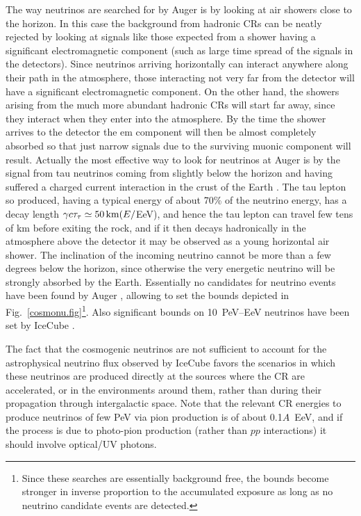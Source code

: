 \documentclass[twoside,12pt]{article}
\begin{document}
The way neutrinos are searched for by Auger is by looking at air showers close to the horizon. In this case the background from hadronic CRs can be neatly rejected by looking at signals like those expected from a shower having a significant  electromagnetic component (such as large time spread of the signals in the detectors). Since neutrinos arriving horizontally can interact anywhere along their path in the atmosphere, those interacting not very far from the detector will have a significant electromagnetic component. On the other hand, the showers arising from the much more abundant hadronic CRs will start far away, since they interact when they enter  into the atmosphere. By the time the shower arrives to the detector the em component will then  be almost completely absorbed so that just narrow signals due to the surviving muonic component will result. Actually the most effective way to look for neutrinos at Auger is by the signal from tau neutrinos coming from slightly below the horizon and having suffered a charged current interaction in the crust of the Earth \cite{taushower}. The tau lepton so produced, having a typical energy of about 70\% of the neutrino energy,  has a decay length $\gamma c\tau_\tau\simeq 50\,{\rm km}(E/$EeV), and hence the tau lepton can travel few tens of km before exiting the rock, and if it then decays hadronically in the atmosphere above the detector it may be observed as a young horizontal air shower. The inclination of the incoming neutrino cannot be more than a few degrees below the horizon, since otherwise the very energetic neutrino will be strongly absorbed by the Earth.
Essentially no candidates for neutrino events have been found by Auger \cite{augernubound}, allowing to set the bounds  depicted in Fig.~\ref{cosmonu.fig}\footnote{Since these searches are essentially background free, the bounds become stronger in inverse proportion to the accumulated exposure as long as no neutrino candidate events are detected.}. Also significant bounds on 10~PeV--EeV neutrinos have been set by IceCube \cite{icnubound}.

The fact that the cosmogenic neutrinos are not sufficient to account for the astrophysical neutrino flux observed by IceCube favors the scenarios in which these neutrinos are produced directly at the sources where the CR are accelerated, or in the environments around them, rather than during their propagation through intergalactic space. Note that the relevant CR energies to produce neutrinos of few PeV via pion production is of about 0.1$A$~EeV, and if the process is due to photo-pion production (rather than $pp$ interactions) it should involve optical/UV photons.
\end{document}
